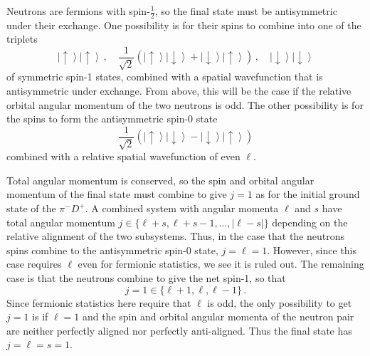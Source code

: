 \documentclass{article}
\theoremstyle{plain}\theoremheaderfont{\normalfont\itshape}\theorembodyfont{\rmfamily}\theoremseparator{.}\newtheorem*{rem}{Remark}\newtheorem*{ex}{Example}\newtheorem*{proof}{Proof}\newtheorem*{altp}{Alternative proof}
\theoremstyle{plain}\theoremheaderfont{\normalfont\bfseries}\theorembodyfont{\rmfamily}\theoremseparator{.}\newtheorem{thm}{Theorem}[section]\newtheorem{lem}[thm]{Lemma}\newtheorem{prop}[thm]{Proposition}\newtheorem*{cor}{Corollary}\newtheorem{defn}[thm]{Definition}\newtheorem{clm}[thm]{Claim}\newtheorem{clminproof}{Claim}
\theoremstyle{break}\theoremheaderfont{\normalfont\itshape}\theorembodyfont{\rmfamily}\theoremseparator{.\medskip}\newtheorem*{proofskip}{Proof}\newtheorem*{exs}{Examples}\newtheorem*{rems}{Remarks}
\theoremstyle{break}\theoremheaderfont{\normalfont\bfseries}\theorembodyfont{\rmfamily}\theoremseparator{.\medskip}\newtheorem{lemskip}[thm]{Lemma}\newtheorem{defnskip}[thm]{Definition}\newtheorem{propskip}[thm]{Proposition}\newtheorem{thmskip}[thm]{Theorem}
\numberwithin{equation}{section}
\newcommand{\ket}[1]{\left| #1 \right\rangle}
\newcommand{\abs}[1]{\left| #1 \right|}
\begin{document}
    Neutrons are fermions with spin-\(\frac{1}{2}\), so the final state must be antisymmetric under their exchange. One possibility is for their spins to combine into one of the triplets
    \begin{equation}
        \ket{\uparrow}\ket{\uparrow}\,,\quad\frac{1}{\sqrt{2}}\left(\ket{\uparrow}\ket{\downarrow}+\ket{\downarrow}\ket{\uparrow}\right)\,,\quad\ket{\downarrow}\ket{\downarrow}
    \end{equation}
    of symmetric spin-1 states, combined with a spatial wavefunction that is antisymmetric under exchange. From above, this will be the case if the relative orbital angular momentum of the two neutrons is odd. The other possibility is for the spins to form the antisymmetric spin-0 state
    \begin{equation}
        \frac{1}{\sqrt{2}}\left(\ket{\uparrow}\ket{\downarrow}-\ket{\downarrow}\ket{\uparrow}\right)
    \end{equation}
    combined with a relative spatial wavefunction of even \(\ell\).

    Total angular momentum is conserved, so the spin and orbital angular momentum of the final state must combine to give \(j=1\) as for the initial ground state of the \(\pi^- D^+\). A combined system with angular momenta \(\ell\) and \(s\) have total angular momentum \(j\in\{\ell+s,\ell+s-1,\dots,\abs{\ell-s}\}\) depending on the relative alignment of the two subsystems. Thus, in the case that the neutrons spins combine to the antisymmetric spin-0 state, \(j=\ell=1\). However, since this case requires \(\ell\) even for fermionic statistics, we see it is ruled out. The remaining case is that the neutrons combine to give the net spin-1, so that
    \begin{equation}
        j=1\in\{\ell+1,\ell,\ell-1\}\,.
    \end{equation}
    Since fermionic statistics here require that \(\ell\) is odd, the only possibility to get \(j=1\) is if \(\ell=1\) and the spin and orbital angular momenta of the neutron pair are neither perfectly aligned nor perfectly anti-aligned. Thus the final state has \(j=\ell=s=1\).
\end{document}
